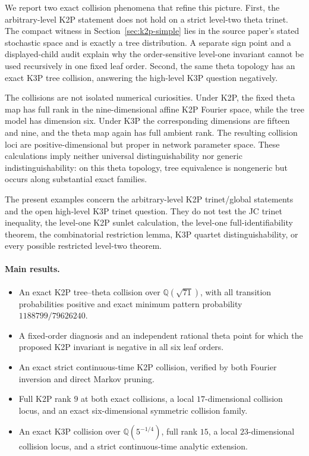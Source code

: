 \documentclass[11pt]{article}
\theoremstyle{remark}\newtheorem{remark}[theorem]{Remark}
\begin{document}
We report two exact collision phenomena that refine this picture. First, the arbitrary-level K2P statement does not hold on a strict level-two theta trinet. The compact witness in Section~\ref{sec:k2p-simple} lies in the source paper's stated stochastic space and is exactly a tree distribution. A separate sign point and a displayed-child audit explain why the order-sensitive level-one invariant cannot be used recursively in one fixed leaf order. Second, the same theta topology has an exact K3P tree collision, answering the high-level K3P question negatively.

The collisions are not isolated numerical curiosities. Under K2P, the fixed theta map has full rank in the nine-dimensional affine K2P Fourier space, while the tree model has dimension six. Under K3P the corresponding dimensions are fifteen and nine, and the theta map again has full ambient rank. The resulting collision loci are positive-dimensional but proper in network parameter space. These calculations imply neither universal distinguishability nor generic indistinguishability: on this theta topology, tree equivalence is nongeneric but occurs along substantial exact families.

The present examples concern the arbitrary-level K2P trinet/global statements and the open high-level K3P trinet question. They do not test the JC trinet inequality, the level-one K2P sunlet calculation, the level-one full-identifiability theorem, the combinatorial restriction lemma, K3P quartet distinguishability, or every possible restricted level-two theorem.

\paragraph{Main results.}
\begin{itemize}
\item An exact K2P tree--theta collision over $\mathbb Q(\sqrt{71})$, with all transition probabilities positive and exact minimum pattern probability $1188799/79626240$.
\item A fixed-order diagnosis and an independent rational theta point for which the proposed K2P invariant is negative in all six leaf orders.
\item An exact strict continuous-time K2P collision, verified by both Fourier inversion and direct Markov pruning.
\item Full K2P rank $9$ at both exact collisions, a local $17$-dimensional collision locus, and an exact six-dimensional symmetric collision family.
\item An exact K3P collision over $\mathbb Q(5^{-1/4})$, full rank $15$, a local $23$-dimensional collision locus, and a strict continuous-time analytic extension.
\end{itemize}
\end{document}
